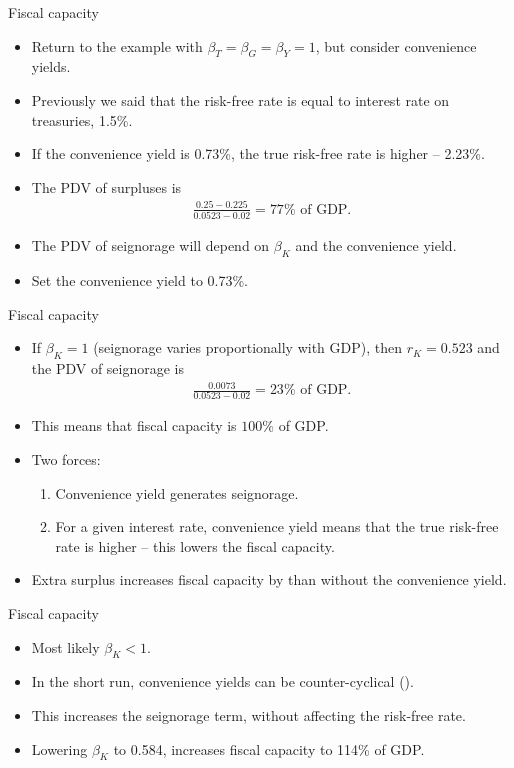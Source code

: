 \documentclass[11pt,xcolor={dvipsnames},aspectratio=159,hyperref={pdftex,pdfpagemode=UseNone,hidelinks,pdfdisplaydoctitle=true},usepdftitle=false]{beamer}
\begin{document}
   \begin{frame}{Fiscal capacity}
    \begin{itemize}
        \item Return to the example with $\beta_T = \beta_G = \beta_Y = 1$, but consider convenience yields. 
        \item Previously we said that the risk-free rate is equal to interest rate on treasuries, 1.5\%.
        \item If the convenience yield is 0.73\%, the true risk-free rate is higher -- 2.23\%.
        \item The PDV of surpluses is \begin{align*}
             \frac{0.25 - 0.225}{0.0523 - 0.02}=77\% \text{ of GDP}.
        \end{align*}
        \item The PDV of seignorage will depend on $\beta_K$ and the convenience yield.
        \item Set the convenience yield to 0.73\%. 
    \end{itemize}
   \end{frame}

   \begin{frame}{Fiscal capacity}
    \begin{itemize}
        \item If $\beta_K=1$ (seignorage varies proportionally with GDP), then $r_K = 0.523$ and the PDV of seignorage is \begin{align*}
            \frac{0.0073}{0.0523 - 0.02}=23\% \text{ of GDP}.
       \end{align*}
        \item This means that fiscal capacity is $100\%$ of GDP.
        \item Two  forces: 
        \begin{enumerate}
            \item Convenience yield generates seignorage.
            \item For a given interest rate, convenience yield means that the true risk-free rate is higher -- this lowers the fiscal capacity.
        \end{enumerate}
        \item Extra surplus increases fiscal capacity by  than without the convenience yield.
    \end{itemize}
   \end{frame}   

   \begin{frame}{Fiscal capacity}
    \begin{itemize}
        \item Most likely $\beta_K < 1$. 
        \item In the short run, convenience yields can be counter-cyclical ().
        \item This increases the seignorage term, without affecting the risk-free rate.
        \item Lowering $\beta_K$ to 0.584, increases fiscal capacity to 114\% of GDP.
    \end{itemize}
   \end{frame}   
  
\end{document}
